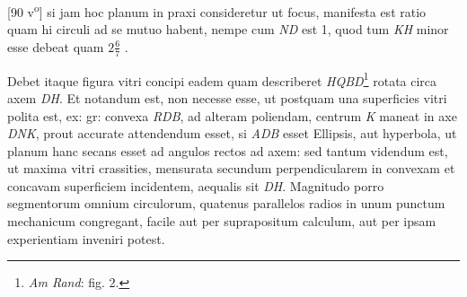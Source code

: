 [90 v\textsuperscript{o}]  si jam hoc planum in praxi consideretur ut focus\protect{}, manifesta est  ratio quam hi circuli ad se mutuo habent, nempe cum \textit{ND}  est 1, quod tum \textit{KH} minor esse debeat quam $\displaystyle2\frac{6}{7}$%
                    .\rule[-4mm]{0mm}{10mm}\pend \pstart  Debet itaque figura vitri concipi eadem quam describeret \textit{HQBD}\footnote{\textit{Am Rand}: fig. 2.} rotata circa axem \textit{DH}. Et notandum est, non  necesse esse, ut postquam una superficies vitri polita est, ex:  gr: convexa \textit{RDB}, ad alteram poliendam, centrum \textit{K} maneat  in axe \textit{DNK}, prout accurate attendendum esset, si \textit{ADB}  esset Ellipsis, aut hyperbola, ut planum hanc secans esset  ad angulos rectos ad axem: sed tantum videndum est, ut  maxima vitri crassities, mensurata secundum perpendicularem  in convexam et concavam superficiem incidentem, aequalis  sit \textit{DH}.
                    \pend 
                    \pstart  Magnitudo porro segmentorum omnium circulorum,  quatenus parallelos radios in unum punctum mechanicum\protect{}  congregant, facile aut per suprapositum calculum, aut  per ipsam experientiam inveniri potest.
                    \pend 
                    